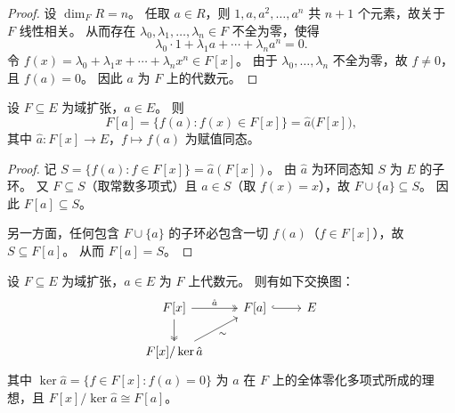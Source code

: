 \documentclass[lang=cn,a4paper,newtx]{elegantbook}
\begin{document}
\begin{proof}
  设 $\dim_F R=n$。
  任取 $a\in R$，则 $1,a,a^2,\dots,a^n$ 共 $n+1$ 个元素，故关于 $F$ 线性相关。
  从而存在 $\lambda_0,\lambda_1,\dots,\lambda_n\in F$ 不全为零，使得
  \[
    \lambda_0\cdot 1+\lambda_1 a+\cdots+\lambda_n a^n=0.
  \]
  令 $f(x)=\lambda_0+\lambda_1 x+\cdots+\lambda_n x^n\in F[x]$。
  由于 $\lambda_0,\dots,\lambda_n$ 不全为零，故 $f\ne 0$，且 $f(a)=0$。
  因此 $a$ 为 $F$ 上的代数元。
\end{proof}
 
 
\begin{proposition}\label{F-a-evaluation}
  设 $F\subseteq E$ 为域扩张，$a\in E$。
  则
  \[
    F[a]=\{f(a): f(x)\in F[x]\}=\hat a\bigl(F[x]\bigr),
  \]
  其中 $\hat a\colon F[x]\to E$，$f\mapsto f(a)$ 为赋值同态。
\end{proposition}
 
\begin{proof}
  记 $S=\{f(a):f\in F[x]\}=\hat a(F[x])$。
  由 $\hat a$ 为环同态知 $S$ 为 $E$ 的子环。
  又 $F\subseteq S$（取常数多项式）且 $a\in S$（取 $f(x)=x$），故 $F\cup\{a\}\subseteq S$。
  因此 $F[a]\subseteq S$。
 
  另一方面，任何包含 $F\cup\{a\}$ 的子环必包含一切 $f(a)$（$f\in F[x]$），故 $S\subseteq F[a]$。
  从而 $F[a]=S$。
\end{proof}
 
\begin{proposition}
  设 $F\subseteq E$ 为域扩张，$a\in E$ 为 $F$ 上代数元。
  则有如下交换图：
  \[
    \begin{tikzcd}
      F[x] \arrow[r,two heads,"\hat a"] \arrow[d,two heads] & F[a] \arrow[r,hook] & E \\
      F[x]/\ker\hat a \arrow[ur,"\sim"']
    \end{tikzcd}
  \]
  其中 $\ker\hat a=\{f\in F[x]:f(a)=0\}$ 为 $a$ 在 $F$ 上的全体零化多项式所成的理想，且 $F[x]/\ker\hat a\cong F[a]$。
\end{proposition}
 
\end{document}
